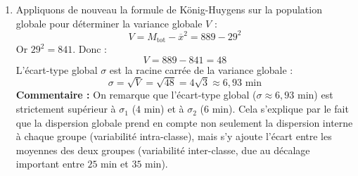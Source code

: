 \documentclass[11pt,a4paper]{article}
\begin{document}
\begin{enumerate}
\begin{enumerate}
        \item Appliquons de nouveau la formule de König-Huygens sur la population globale pour déterminer la variance globale $V$ :
        \[ V = M_{\text{tot}} - \overline{x}^2 = 889 - 29^2 \]
        Or $29^2 = 841$. Donc :
        \[ V = 889 - 841 = 48 \]
        L'écart-type global $\sigma$ est la racine carrée de la variance globale :
        \[ \sigma = \sqrt{V} = \sqrt{48} = 4\sqrt{3} \approx 6,93 \text{ min} \]
        \textbf{Commentaire :} On remarque que l'écart-type global ($\sigma \approx 6,93$ min) est strictement supérieur à $\sigma_1$ ($4$ min) et à $\sigma_2$ ($6$ min). Cela s'explique par le fait que la dispersion globale prend en compte non seulement la dispersion interne à chaque groupe (variabilité intra-classe), mais s'y ajoute l'écart entre les moyennes des deux groupes (variabilité inter-classe, due au décalage important entre $25$ min et $35$ min).
    \end{enumerate}
\end{enumerate}
\end{document}
